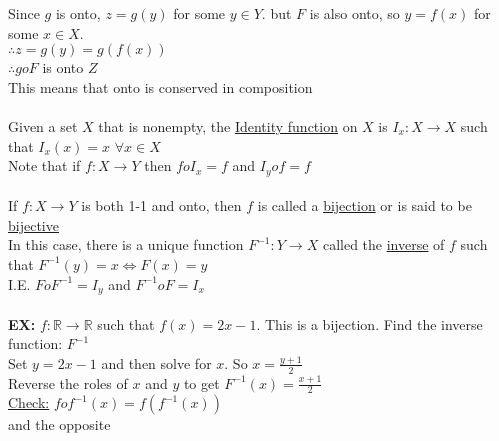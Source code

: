 \documentclass{article}
\begin{document}
		 Since $g$ is onto, $z=g(y)$ for some $y\in Y$. but $F$ is also onto, so $y=f(x)$ for some $x\in X$.\\
		 $\therefore z=g(y)=g(f(x))$\\
		 $\therefore goF$ is onto $Z$\\
		 This means that onto is conserved in composition
		 \\ \\ 
		 Given a set $X$ that is nonempty, the \underline{Identity function} on $X$ is $I_x:X\rightarrow X$ such that $I_x(x)=x$ $\forall x\in X$\\
		 Note that if $f: X\rightarrow Y$ then $foI_x=f$ and $I_yof = f$\\
		 \\
		 If $f:X\rightarrow Y$ is both 1-1 and onto, then $f$ is called a \underline{bijection} or is said to be \underline{bijective}\\
		 In this case, there is a unique function $F^{-1}:Y\rightarrow X$ called the \underline{inverse} of $f$ such that $F^{-1}(y)=x\iff F(x)=y$\\
		 I.E. $FoF^{-1}=I_y$ and $F^{-1}oF=I_x$\\
		 \\
		 \textbf{EX:} $f:\mathbb{R}\rightarrow\mathbb{R}$ such that $f(x)=2x-1$. This is a bijection. Find the inverse function: $F^{-1}$\\
		 Set $y=2x-1$ and then solve for $x$. So $x=\frac{y+1}{2}$\\
		 Reverse the roles of $x$ and $y$ to get $F^{-1}(x)=\frac{x+1}{2}$\\
		 \underline{Check:} $fof^{-1}(x)=f(f^{-1}(x))$\\
		and the opposite
\end{document}
